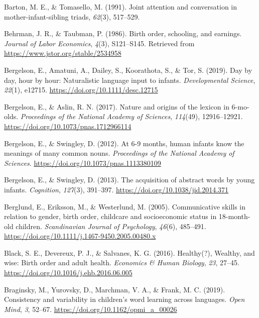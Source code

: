 \documentclass[
  english,
  man,floatsintext]{apa6}
\begin{document}
\leavevmode\hypertarget{ref-barton_joint_1991}{}%
Barton, M. E., \& Tomasello, M. (1991). Joint attention and conversation in mother-infant-sibling triads, \emph{62}(3), 517--529.

\leavevmode\hypertarget{ref-behrman_birth_1986}{}%
Behrman, J. R., \& Taubman, P. (1986). Birth order, schooling, and earnings. \emph{Journal of Labor Economics}, \emph{4}(3), S121--S145. Retrieved from \url{https://www.jstor.org/stable/2534958}

\leavevmode\hypertarget{ref-bergelson_day_2019}{}%
Bergelson, E., Amatuni, A., Dailey, S., Koorathota, S., \& Tor, S. (2019). Day by day, hour by hour: Naturalistic language input to infants. \emph{Developmental Science}, \emph{22}(1), e12715. \url{https://doi.org/10.1111/desc.12715}

\leavevmode\hypertarget{ref-bergelson_nature_2017}{}%
Bergelson, E., \& Aslin, R. N. (2017). Nature and origins of the lexicon in 6-mo-olds. \emph{Proceedings of the National Academy of Sciences}, \emph{114}(49), 12916--12921. \url{https://doi.org/10.1073/pnas.1712966114}

\leavevmode\hypertarget{ref-bergelson_at_2012}{}%
Bergelson, E., \& Swingley, D. (2012). At 6-9 months, human infants know the meanings of many common nouns. \emph{Proceedings of the National Academy of Sciences}. \url{https://doi.org/10.1073/pnas.1113380109}

\leavevmode\hypertarget{ref-bergelson_acquisition_2013}{}%
Bergelson, E., \& Swingley, D. (2013). The acquisition of abstract words by young infants. \emph{Cognition}, \emph{127}(3), 391--397. \url{https://doi.org/10.1038/jid.2014.371}

\leavevmode\hypertarget{ref-berglund_communicative_2005}{}%
Berglund, E., Eriksson, M., \& Westerlund, M. (2005). Communicative skills in relation to gender, birth order, childcare and socioeconomic status in 18-month-old children. \emph{Scandinavian Journal of Psychology}, \emph{46}(6), 485--491. \url{https://doi.org/10.1111/j.1467-9450.2005.00480.x}

\leavevmode\hypertarget{ref-black_healthy_2016}{}%
Black, S. E., Devereux, P. J., \& Salvanes, K. G. (2016). Healthy(?), Wealthy, and wise: Birth order and adult health. \emph{Economics \& Human Biology}, \emph{23}, 27--45. \url{https://doi.org/10.1016/j.ehb.2016.06.005}

\leavevmode\hypertarget{ref-braginsky_consistency_2019}{}%
Braginsky, M., Yurovsky, D., Marchman, V. A., \& Frank, M. C. (2019). Consistency and variability in children's word learning across languages. \emph{Open Mind}, \emph{3}, 52--67. \url{https://doi.org/10.1162/opmi_a_00026}
\end{document}
